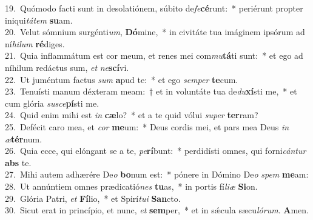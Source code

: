 {19.~}Quómodo facti sunt in desolatiónem, súbito de\textit{fe}\textbf{cé}runt:~* periérunt propter iniqui\textit{tá}\textit{tem} \textbf{su}am.\\
{20.~}Velut sómnium surgénti\textit{um}, \textbf{Dó}mine,~* in civitáte tua imáginem ipsórum ad ní\textit{hi}\textit{lum} \textbf{ré}diges.\\
{21.~}Quia inflammátum est cor meum, et renes mei com\textit{mu}\textbf{tá}ti sunt:~* et ego ad níhilum redáctus sum, \textit{et} \textit{ne}\textbf{scí}vi.\\
{22.~}Ut juméntum factus \textit{sum} \textbf{a}pud te:~* et ego \textit{sem}\textit{per} \textbf{te}cum.\\
{23.~}Tenuísti manum déxteram meam:~† et in voluntáte tua de\textit{du}\textbf{xí}sti me,~* et cum glória \textit{su}\textit{sce}\textbf{pí}sti me.\\
{24.~}Quid enim mihi est \textit{in} \textbf{cæ}lo?~* et a te quid vólui \textit{su}\textit{per} \textbf{ter}ram?\\
{25.~}Defécit caro mea, et \textit{cor} \textbf{me}um:~* Deus cordis mei, et pars mea Deus \textit{in} \textit{æ}\textbf{tér}num.\\
{26.~}Quia ecce, qui elóngant se a te, \textit{pe}\textbf{rí}bunt:~* perdidísti omnes, qui forni\textit{cán}\textit{tur} \textbf{abs} te.\\
{27.~}Mihi autem adhærére De\textit{o} \textbf{bo}num est:~* pónere in Dómino De\textit{o} \textit{spem} \textbf{me}am:\\
{28.~}Ut annúntiem omnes prædicatió\textit{nes} \textbf{tu}as,~* in portis fí\textit{li}\textit{æ} \textbf{Si}on.\\
{29.~}Glória Patri, \textit{et} \textbf{Fí}lio,~* et Spirí\textit{tu}\textit{i} \textbf{San}cto.\\
{30.~}Sicut erat in princípio, et nunc, \textit{et} \textbf{sem}per,~* et in sǽcula sæcu\textit{ló}\textit{rum}. \textbf{A}men.\\
